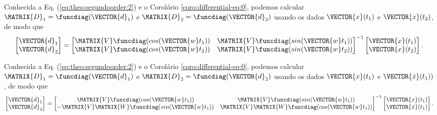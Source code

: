 \begin{corollary}
\label{coro:differential-eq:1}
Conhecida a Eq. (\ref{eq:theo:segundoorder:2}) e o Corolário \ref{coro:differential-eq:0},
podemos calcular
$\MATRIX{D}_1=\funcdiag(\VECTOR{d}_1)$ e $\MATRIX{D}_2=\funcdiag(\VECTOR{d}_2)$ 
usando os dados $\VECTOR{x}(t_1)$ e $\VECTOR{x}(t_2)$, de modo que
\begin{equation}\label{eq:coro:differential-eq:1:a}
\begin{bmatrix}
\VECTOR{d}_1\\
\VECTOR{d}_2
\end{bmatrix}
=
\begin{bmatrix}
\MATRIX{V} \funcdiag(cos(\VECTOR{w}t_1)) &  \MATRIX{V} \funcdiag(sin(\VECTOR{w}t_1))\\
\MATRIX{V} \funcdiag(cos(\VECTOR{w}t_2)) &  \MATRIX{V} \funcdiag(sin(\VECTOR{w}t_2))
\end{bmatrix}^{-1}
\begin{bmatrix}
\VECTOR{x}(t_1)\\
\VECTOR{x}(t_2)
\end{bmatrix}.
\end{equation}
\end{corollary}

\begin{corollary}
\label{coro:differential-eq:2}
Conhecida a Eq. (\ref{eq:theo:segundoorder:2}) e o Corolário \ref{coro:differential-eq:0},
podemos calcular
$\MATRIX{D}_1=\funcdiag(\VECTOR{d}_1)$ e $\MATRIX{D}_2=\funcdiag(\VECTOR{d}_2)$ 
usando os dados $\VECTOR{x}(t_1)$ e $\VECTOR{\dot{x}}(t_1))$, de modo que
\begin{equation}\label{eq:coro:differential-eq:2:1}
\begin{bmatrix}
\VECTOR{d}_1\\
\VECTOR{d}_2
\end{bmatrix}
=
\begin{bmatrix}
\MATRIX{V} \funcdiag(cos(\VECTOR{w}t_1)) &  \MATRIX{V} \funcdiag(sin(\VECTOR{w}t_1))\\
-\MATRIX{V}\MATRIX{W} \funcdiag(sin(\VECTOR{w}t_1)) &  \MATRIX{V}\MATRIX{W}\funcdiag(cos(\VECTOR{w}t_1))
\end{bmatrix}^{-1}
\begin{bmatrix}
\VECTOR{x}(t_1)\\
\VECTOR{\dot{x}}(t_1)
\end{bmatrix}.
\end{equation}
\end{corollary}


